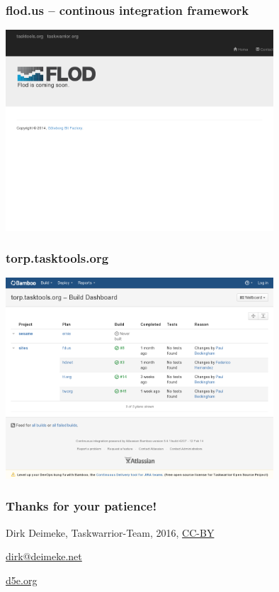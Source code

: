 \documentclass[t,handout]{beamer}
\begin{document}
\begin{frame}\frametitle{flod.us -- continous integration framework}
\begin{center}
\href{http://flod.us/}{\includegraphics[width=10cm,height=7.5cm]{flod-us.png}}
\end{center}
\end{frame}

\begin{frame}\frametitle{torp.tasktools.org}
\begin{center}
\href{https://torp.tasktools.org}{\includegraphics[width=10cm,height=7.5cm]{torp-tasktools-org.png}}
\end{center}
\end{frame}

\begin{frame}\frametitle{Thanks for your patience!}
\begin{center}
Dirk Deimeke, Taskwarrior-Team, 2016, \href{https://creativecommons.org/licenses/by/4.0/}{CC-BY}

\href{mailto:dirk@deimeke.net}{dirk@deimeke.net}

\href{http://d5e.org/}{d5e.org}
\end{center}
\end{frame}
\end{document}
